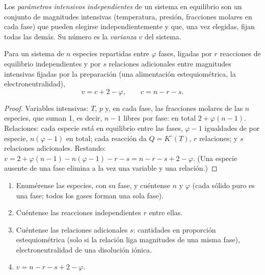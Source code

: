 \begin{definition}[Varianza]\label{def:b2:equilibrium-shifts:variance}
Los \emph{parámetros intensivos independientes}
de un sistema en equilibrio son un conjunto de magnitudes intensivas
(temperatura, presión, fracciones molares en cada fase) que pueden elegirse
independientemente y que, una vez elegidas, fijan todas las demás. Su número es la
\emph{varianza} $v$ del sistema.
\end{definition}

\begin{theorem}\label{thm:b2:equilibrium-shifts:phase-rule}
Para un sistema de $n$ especies repartidas entre $\varphi$ fases, ligadas por $r$
reacciones de equilibrio independientes y por $s$ relaciones adicionales entre
magnitudes intensivas fijadas por la preparación (una alimentación estequiométrica,
la electroneutralidad),
\[
  v = c + 2 - \varphi, \qquad c = n - r - s .
\]
\end{theorem}

\begin{proof}
Variables intensivas: $T$, $p$ y, en cada fase, las fracciones molares de las
$n$ especies, que suman 1, es decir, $n - 1$ libres por fase: en total $2 +
\varphi(n - 1)$. Relaciones: cada especie está en equilibrio entre las
fases, $\varphi - 1$ igualdades de  por especie, $n(\varphi -
1)$ en total; cada reacción da $Q = K^\circ(T)$, $r$ relaciones; y $s$
relaciones adicionales. Restando: $v = 2 + \varphi(n - 1) - n(\varphi - 1) - r -
s = n - r - s + 2 - \varphi$. (Una especie ausente de una fase elimina a la vez una
variable y una relación.)
\end{proof}

\begin{method}\label{met:b2:equilibrium-shifts:variance}
\begin{enumerate}
  \item Enumérense las especies, con su fase, y cuéntense $n$ y $\varphi$
        (cada sólido puro es una fase; todos los gases forman una sola fase).
  \item Cuéntense las reacciones independientes $r$ entre ellas.
  \item Cuéntense las relaciones adicionales $s$: cantidades en proporción estequiométrica
        (solo si la relación liga magnitudes de una misma fase),
        electroneutralidad de una disolución iónica.
  \item $v = n - r - s + 2 - \varphi$.
\end{enumerate}
\end{method}

